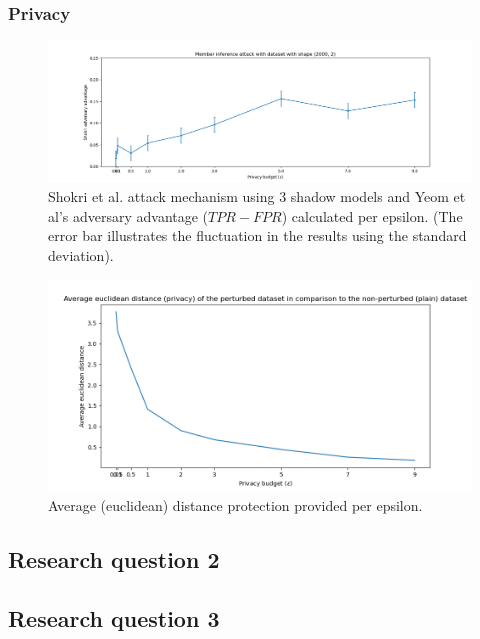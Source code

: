 \subsubsection{Privacy}

\begin{figure}[!htb]
  \includegraphics[width=1\linewidth]{Results/rq1/shokri_privacy_adv_2000.png}
  \caption{Shokri et al. attack mechanism using 3 shadow models and Yeom et al's adversary advantage ($TPR - FPR$) calculated per epsilon. (The error bar illustrates the fluctuation in the results using the standard deviation).}
\end{figure}
\begin{figure}[!htb]
  \includegraphics[width=1\linewidth]{Results/rq1/avg_euclidean.png}
  \caption{Average (euclidean) distance protection provided per epsilon.}
\end{figure}
\newpage
\subsection{Research question 2}
\subsection{Research question 3}